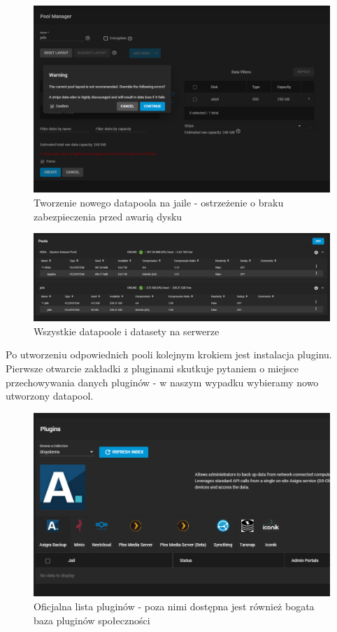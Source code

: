 \documentclass[12pt,a4paper]{article}
\newcommand{\<}{\langle}
\renewcommand{\>}{\rangle}
\theoremstyle{definition}
\begin{document}
\begin{figure}[H]
    \centering
    \includegraphics[width=\linewidth]{img/ss_plex/2.png}
    \caption{Tworzenie nowego datapoola na jaile - ostrzeżenie o braku zabezpieczenia przed awarią dysku}
\end{figure}

\begin{figure}[H]
    \centering
    \includegraphics[width=\linewidth]{img/ss_plex/3.png}
    \caption{Wszystkie datapoole i datasety na serwerze}
\end{figure}

Po utworzeniu odpowiednich pooli kolejnym krokiem jest instalacja pluginu. Pierwsze otwarcie zakładki z pluginami skutkuje pytaniem o miejsce przechowywania danych pluginów - w naszym wypadku wybieramy nowo utworzony datapool.

\begin{figure}[H]
    \centering
    \includegraphics[width=\linewidth]{img/ss_plex/4.png}
    \caption{Oficjalna lista pluginów - poza nimi dostępna jest również bogata baza pluginów społeczności}
\end{figure}
\end{document}
